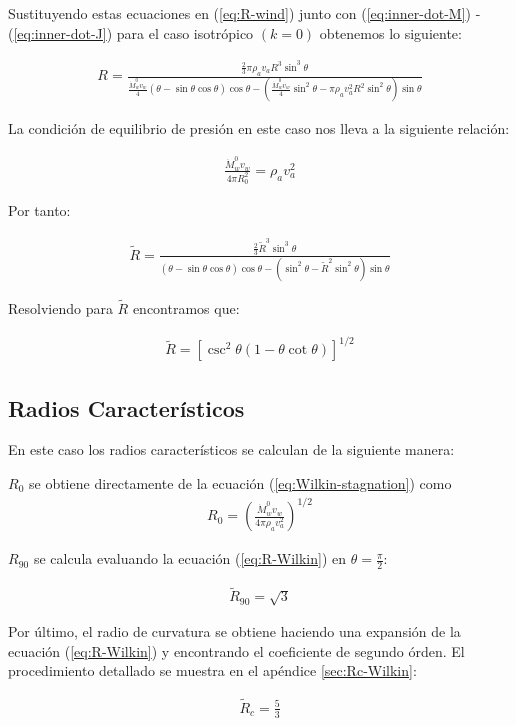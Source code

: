 Sustituyendo estas ecuaciones en (\ref{eq:R-wind}) junto con (\ref{eq:inner-dot-M}) - (\ref{eq:inner-dot-J})
para el caso isotrópico $(k=0)$ obtenemos lo siguiente:

\begin{align}
  R = \frac{\frac{2}{3}\pi\rho_a v_a R^3 \sin^3\theta}{\frac{\dot{M}^0_w v_w}{4}\left(\theta-\sin\theta\cos\theta\right)\cos\theta
  - \left(\frac{\dot{M}^0_w v_w}{4}\sin^2\theta - \pi\rho_a v^2_a R^2 \sin^2\theta\right)\sin\theta}
\end{align}

La condición de equilibrio de presión en este caso nos lleva a la siguiente relación:

\begin{align}
  \frac{\dot{M}^0_w v_w}{4\pi R^2_0} = \rho_a v^2_a \label{eq:Wilkin-stagnation}
\end{align}

Por tanto:

\begin{align}
  \tilde{R} = \frac{\frac{2}{3}\tilde{R}^3 \sin^3\theta}{\left(\theta-\sin\theta\cos\theta\right)\cos\theta
  - \left(\sin^2\theta - \tilde{R}^2 \sin^2\theta\right)\sin\theta}
\end{align}

Resolviendo para $\tilde{R}$ encontramos que:

\begin{align}
  \tilde{R} = \left[\csc^2\theta\left(1 - \theta\cot\theta\right)\right]^{1/2} \label{eq:R-Wilkin}
\end{align}

\subsection{Radios Característicos}
\label{sec:Wilkin-Char-Radii}

En este caso los radios característicos se calculan de la siguiente manera:

$R_0$ se obtiene directamente de la ecuación (\ref{eq:Wilkin-stagnation}) como
\begin{align}
  R_0 = \left(\frac{\dot{M}^0_w v_w}{4\pi \rho_a v^2_a}\right)^{1/2}
\end{align}

$R_{90}$ se calcula evaluando la ecuación (\ref{eq:R-Wilkin}) en $\theta=\frac{\pi}{2}$:

\begin{align}
  \tilde{R}_{90} = \sqrt{3} \label{eq:R90-Wilkin}
\end{align}

Por último, el radio de curvatura se obtiene haciendo una expansión de la ecuación (\ref{eq:R-Wilkin}) y
encontrando el coeficiente de segundo órden. El procedimiento detallado se muestra en el apéndice \ref{sec:Rc-Wilkin}:

\begin{align}
\tilde{R}_c = \frac{5}{3} \label{eq:Rc-Wilkin}
\end{align}
